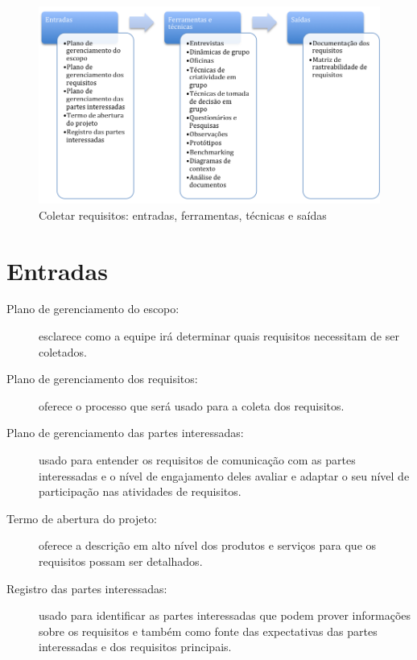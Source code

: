 \begin{figure}[!h]
	\centering
	\includegraphics[scale=0.5]{Figuras/escopo_efts_requisitos.png}
	\caption{Coletar requisitos: entradas, ferramentas, técnicas e saídas}
	\label{fig:escopo:req:efts}
\end{figure}

\section{Entradas}

\begin{description}

	\item[Plano de gerenciamento do escopo:] esclarece como a equipe irá determinar quais requisitos necessitam de ser coletados.

	\item[Plano de gerenciamento dos requisitos:] oferece o processo que será usado para a coleta dos requisitos.

	\item[Plano de gerenciamento das partes interessadas:] usado para entender os requisitos de comunicação com as partes interessadas e o nível de engajamento deles avaliar e adaptar o seu nível de participação nas atividades de requisitos.

	\item[Termo de abertura do projeto:] oferece a descrição em alto nível dos produtos e serviços para que os requisitos possam ser detalhados.

	\item[Registro das partes interessadas:] usado para identificar as partes interessadas que podem prover informações sobre os requisitos e também como fonte das expectativas das partes interessadas e dos requisitos principais.

\end{description}

